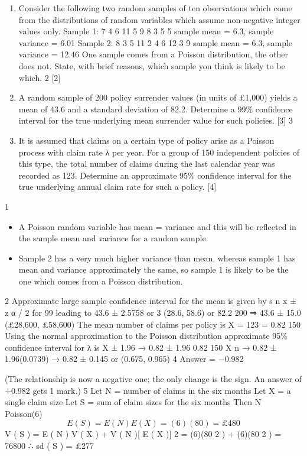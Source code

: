 \documentclass[a4paper,12pt]{article}
\begin{document}
\begin{enumerate}

\item Consider the following two random samples of ten observations which come from the
distributions of random variables which assume non-negative integer values only.
Sample 1: 7 4 6 11 5 9 8 3 5 5
sample mean = 6.3, sample variance = 6.01
Sample 2: 8 3 5 11 2 4 6 12 3 9
sample mean = 6.3, sample variance = 12.46
One sample comes from a Poisson distribution, the other does not.
State, with brief reasons, which sample you think is likely to be which.
2
[2]
\item A random sample of 200 policy surrender values (in units of £1,000) yields a mean of
43.6 and a standard deviation of 82.2.
Determine a 99\% confidence interval for the true underlying mean surrender value for
such policies.
[3]
3
\item It is assumed that claims on a certain type of policy arise as a Poisson process with
claim rate λ per year.
For a group of 150 independent policies of this type, the total number of claims during
the last calendar year was recorded as 123.
Determine an approximate 95\% confidence interval for the true underlying annual
claim rate for such a policy.
[4]
\end{enumerate}
\newpage
1
\begin{itemize}
    \item A Poisson random variable has mean = variance and this will be reflected in the
sample mean and variance for a random sample.
\item Sample 2 has a very much higher variance than mean, whereas sample 1 has mean
and variance approximately the same, so sample 1 is likely to be the one which comes
from a Poisson distribution.
\end{itemize}

2
Approximate large sample confidence interval for the mean is given by
s
n
x ± z α / 2
for 99%
leading to 43.6 ± 2.5758
or
3
(28.6, 58.6)
or
82.2
200
⇒ 43.6 ± 15.0
(£28,600, £58,600)
The mean number of claims per policy is X =
123
= 0.82
150
Using the normal approximation to the Poisson distribution approximate 95\% confidence interval for λ is X ± 1.96
→ 0.82 ± 1.96
0.82
150
X
n
→ 0.82 ± 1.96(0.0739)
→ 0.82 ± 0.145 or (0.675, 0.965)
4
Answer = −0.982

(The relationship is now a negative one; the only change is the sign. An answer of
+0.982 gets 1 mark.)
5
Let N = number of claims in the six months
Let X = a single claim size
Let S = sum of claim sizes for the six months
Then N ~ Poisson(6)
\[E ( S ) = E ( N ) E ( X ) = (6)(80) = £480\]
V ( S ) = E ( N ) V ( X ) + V ( N )[ E ( X )] 2 = (6)(80 2 ) + (6)(80 2 ) = 76800
∴ sd ( S ) = £277
\end{document}

